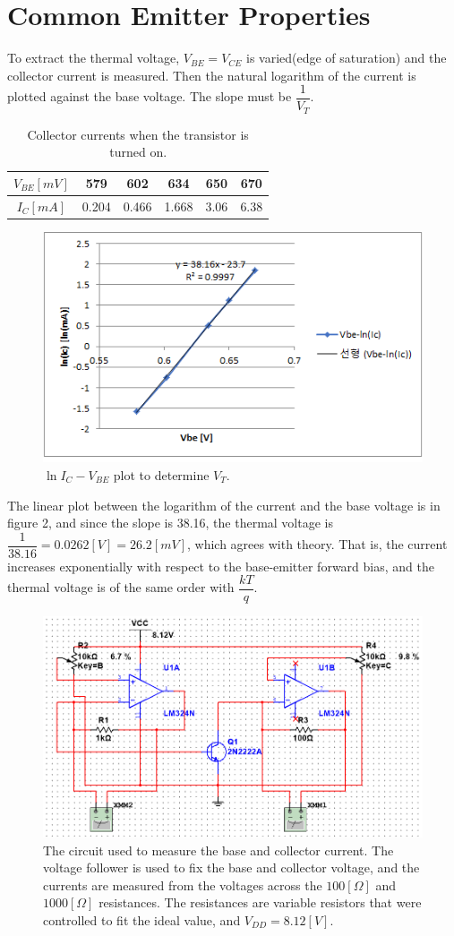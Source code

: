 \documentclass[a4paper, itemph]{oblivoir}
\theoremstyle{definition}
\begin{document}
\section{Common Emitter Properties}
To extract the thermal voltage, $V_{BE}=V_{CE}$ is varied(edge of saturation) and the collector current is measured. Then the natural logarithm of the current is plotted against the base voltage. The slope must be $\dfrac{1}{V_T}$.
\begin{table}[htb]
    \centering
    \begin{tabular}{c|c|c|c|c|c}
        $V_{BE}[mV]$ & 579 & 602 & 634 & 650 & 670 \\
         \hline
         $I_C[mA]$ & 0.204 & 0.466 & 1.668 & 3.06 & 6.38
    \end{tabular}
    \caption{Collector currents when the transistor is turned on.}
\end{table}

\begin{figure}[htb]
    \centering
    \includegraphics[width=0.5\linewidth]{V_T.png}
    \caption{$\ln{I_C}-V_{BE}$ plot to determine $V_T$.}
\end{figure}
The linear plot between the logarithm of the current and the base voltage is in figure 2, and since the slope is 38.16, the thermal voltage is $\dfrac{1}{38.16}=0.0262[V]=26.2[mV]$, which agrees with theory. That is, the current increases exponentially with respect to the base-emitter forward bias, and the thermal voltage is of the same order with $\dfrac{kT}{q}$.
\begin{figure}[htb]
    \centering
    \includegraphics[width=0.5\linewidth]{CE_circuit.PNG}
    \caption{The circuit used to measure the base and collector current. The voltage follower is used to fix the base and collector voltage, and the currents are measured from the voltages across the $100[\Omega]$ and $1000[\Omega]$ resistances. The resistances are variable resistors that were controlled to fit the ideal value, and $V_{DD}=8.12[V]$.}
\end{figure}
\end{document}
